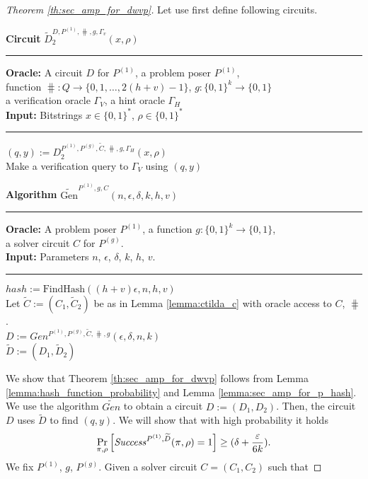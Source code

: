 %
\begin{proof}[Theorem \ref{th:sec_amp_for_dwvp}]
Let use first define following circuits.
%
\begin{codeblock}
  \textbf{Circuit} $\widetilde{D}_2^{D, P^{(1)}, \hash, g, \Gamma_v}(x, \rho)$
  \medskip
  \hrule
  \medskip
  \textbf{Oracle:} A circuit $D$ for $P^{(1)}$, a problem poser $P^{(1)}$, \\
  \IndII function $\hash: Q \rightarrow \{0,1, \dots, 2(h+v) - 1\}$, $g: \{0,1\}^{k} \rightarrow \{0,1\}$ \\
  \IndII a verification oracle $\Gamma_V$, a hint oracle $\Gamma_H$\\
  \textbf{Input:}  Bitstrings $x \in \{0,1\}^{*}$, $\rho \in \{0,1\}^{*}$
  \medskip\hrule\medskip
  $(q, y) := D_2^{P^{(1)}, P^{(g)}, \widetilde{C}, \hash, g, \Gamma_H}(x, \rho)$ \\
  Make a verification query to $\Gamma_V$ using $(q,y)$
\end{codeblock}
%
\begin{codeblock}
  \textbf{Algorithm} $\widetilde{\text{Gen}}^{P^{(1)}, g, C}(n, \epsilon, \delta, k, h, v)$
  \medskip \hrule \medskip
  \textbf{Oracle:} A problem poser $P^{(1)}$, a function $g: \{0,1\}^{k} \rightarrow \{0,1\}$, \\
  \IndII a solver circuit $C$ for $P^{(g)}$.  \\
  \textbf{Input:} Parameters $n$, $\epsilon$, $\delta$, $k$, $h$, $v$.
  \medskip\hrule\medskip
  $hash := \text{FindHash}((h+v)\epsilon, n, h, v)$ \\
  Let $\widetilde{C} := (C_1, \widetilde{C}_2)$ be as in Lemma \ref{lemma:ctilda_c} with oracle access to $C$, $\hash$. \\
  $D := Gen^{P^{(1)}, P^{(g)}, \widetilde{C}, \hash, g}(\epsilon, \delta, n, k)$ \\
  \Return $\widetilde{D} := (D_1, \widetilde{D}_2)$
\end{codeblock}
%
We show that Theorem \ref{th:sec_amp_for_dwvp} follows from Lemma \ref{lemma:hash_function_probability} and Lemma \ref{lemma:sec_amp_for_p_hash}.
We use the algorithm $\widetilde{Gen}$ to obtain a circuit $D := (D_1, D_2)$. Then, the circuit $D$ uses $\widetilde{D}$ to find $(q,y)$.
We will show that with high probability it holds
\begin{align*}
    \underset{\pi, \rho}{\Pr}\left[\operatorname{\mathit{Success}}^{P^{(1)},\widetilde{D}}(\pi, \rho) = 1\right] \geq (\delta + \frac{\varepsilon}{6k}).
\end{align*}
%
We fix $P^{(1)}$, $g$, $P^{(g)}$. Given a solver circuit $C = (C_1, C_2)$ such that

\end{proof}
